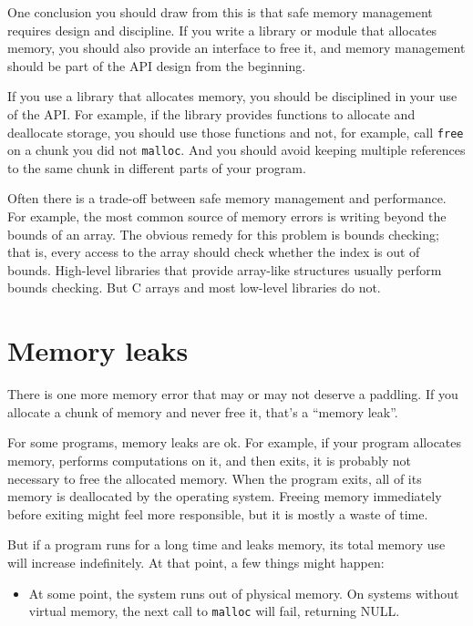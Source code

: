 \documentclass[12pt]{book}
\begin{document}
{One conclusion you should draw from this is that safe memory
management requires design and discipline.  If you write a library
or module that allocates memory, you should also provide an
interface to free it, and memory management should be part of
the API design from the beginning.

If you use a library that allocates memory, you should be disciplined
in your use of the API.  For example, if the library provides
functions to allocate and deallocate storage, you should use those
functions and not, for example, call {\tt free} on a chunk you did not
{\tt malloc}.  And you should avoid keeping multiple references to the
same chunk in different parts of your program.

Often there is a trade-off between safe memory management and performance.
For example, the most common source of memory errors is writing 
beyond the bounds of an array.  The obvious remedy for this problem
is bounds checking; that is, every access to the array should check
whether the index is out of bounds.  High-level libraries that provide
array-like structures usually perform bounds checking.  But C arrays
and most low-level libraries do not.


\section{Memory leaks}
\label{leak}

There is one more memory error that may or may not deserve a paddling.
If you allocate a chunk of memory and never free it, that's a ``memory
leak''.

For some programs, memory leaks are ok.  For example, if your program
allocates memory, performs computations on it, and then exits, it is
probably not necessary to free the allocated memory.  When the program
exits, all of its memory is deallocated by the operating system.
Freeing memory immediately before exiting might feel more responsible,
but it is mostly a waste of time.

But if a program runs for a long time and leaks memory, its total
memory use will increase indefinitely.  At that point, a few things
might happen:

\begin{itemize}

\item At some point, the system runs out of physical memory.  On
  systems without virtual memory, the next call to {\tt malloc} will
  fail, returning NULL.


\end{itemize}}
\end{document}
